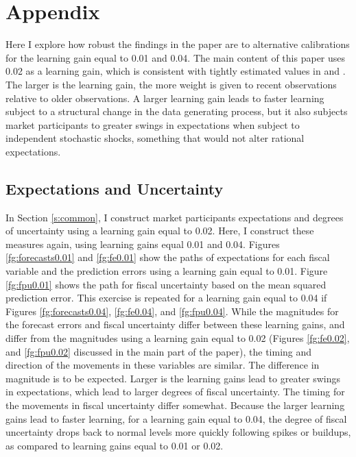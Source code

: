 \documentclass[11pt]{article}
\newcommand{\citee}[1]{\citet{#1}}
\begin{document}
\nocite{*}
\begin{singlespace}


\end{singlespace}

\newpage
\appendix
\section{Appendix} 

Here I explore how robust the findings in the paper are to alternative calibrations for the learning gain equal to 0.01 and 0.04.  The main content of this paper uses 0.02 as a learning gain, which is consistent with tightly estimated values in \citee{milani2007} and \citee{slobodyan_wouters_2012}.  The larger is the learning gain, the more weight is given to recent observations relative to older observations.  A larger learning gain leads to faster learning subject to a structural change in the data generating process, but it also subjects market participants to greater swings in expectations when subject to independent stochastic shocks, something that would not alter rational expectations.  

\subsection{Expectations and Uncertainty}
In Section \ref{s:common}, I construct market participants expectations and degrees of uncertainty using a learning gain equal to 0.02.  Here, I construct these measures again, using learning gains equal 0.01 and 0.04.  Figures \ref{fg:forecasts0.01} and \ref{fg:fe0.01} show the paths of expectations for each fiscal variable and the prediction errors using a learning gain equal to 0.01.  Figure \ref{fg:fpu0.01} shows the path for fiscal uncertainty based on the mean squared prediction error.  This exercise is repeated for a learning gain equal to 0.04 if Figures \ref{fg:forecasts0.04}, \ref{fg:fe0.04}, and \ref{fg:fpu0.04}.  While the magnitudes for the forecast errors and fiscal uncertainty differ between these learning gains, and differ from the magnitudes using a learning gain equal to 0.02 (Figures \ref{fg:fe0.02}, and \ref{fg:fpu0.02} discussed in the main part of the paper), the timing and direction of the movements in these variables are similar.  The difference in magnitude is to be expected.  Larger is the learning gains lead to greater swings in expectations, which lead to larger degrees of fiscal uncertainty.  The timing for the movements in fiscal uncertainty differ somewhat.  Because the larger learning gains lead to faster learning, for a learning gain equal to 0.04, the degree of fiscal uncertainty drops back to normal levels more quickly following spikes or buildups, as compared to learning gains equal to 0.01 or 0.02.
\end{document}
